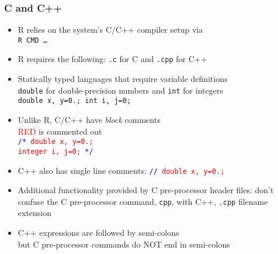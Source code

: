 \documentclass[11pt,pdftex,dvipsnames,usenames,helvetica]{beamer}
\begin{document}
\begin{frame}[fragile]
\frametitle{C and C++}

\begin{itemize}
\item R relies on the system's C/C++ compiler setup via\\ {\tt R CMD \dots}
\item %
R requires the following: {\tt .c} for C and {\tt .cpp} for C++
\item Statically typed languages that require variable definitions\\
{\tt double} for double-precision numbers and {\tt int} for integers\\
{\tt double x, y=0.; int i, j=0;}
\item Unlike R, C/C++ have {\it block} comments\\
\textcolor{red}{RED} is commented out\\
{\tt \textcolor{blue}{/*} 
\textcolor{red}{double x, y=0.;\\ 
\quad integer i, j=0;} \textcolor{blue}{*/} \\}
\item C++ also has single line comments: {\tt \textcolor{blue}{//} 
\textcolor{red}{double x, y=0.;}}
\item Additional functionality provided by C pre-processor 
header files: don't confuse the C pre-processor command, {\tt cpp}, 
with C++, {\tt .cpp} filename extension\\
\item C++ expressions are followed by semi-colons\\
but C pre-processor commands do NOT end in semi-colons 
\end{itemize}

\end{frame}
\end{document}
